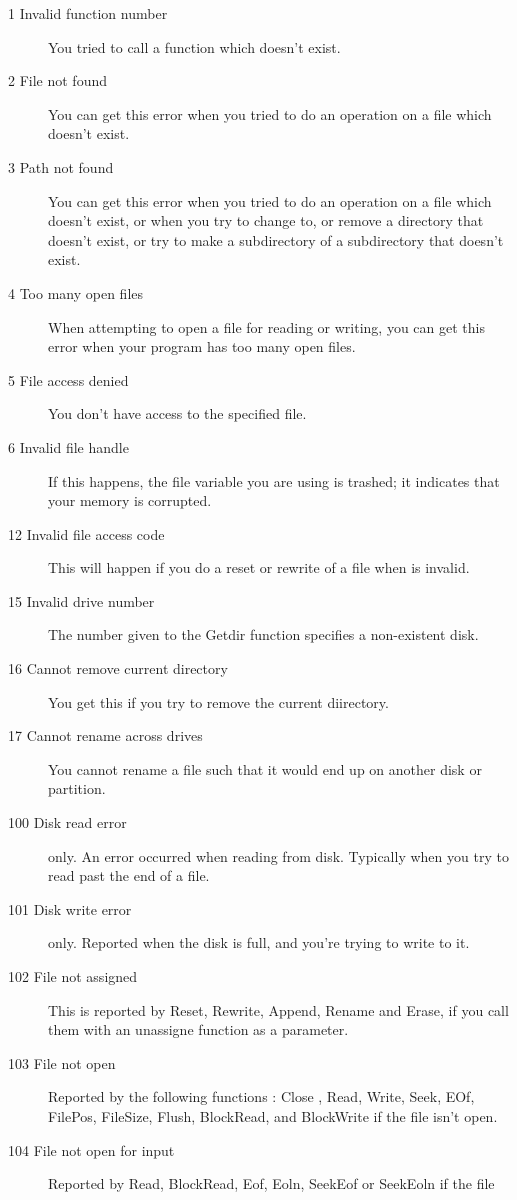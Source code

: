 \documentclass{report}
\begin{document}
\begin{description}
\item [1  Invalid function number]
You tried to call a \dos function which doesn't exist.
\item [2  File not found]
You can get this error when you tried to do an operation on a file which
doesn't exist.
\item [3  Path not found]
You can get this error when you tried to do an operation on a file which
doesn't exist, or when you try to change to, or remove a directory that doesn't exist,
or try to make a subdirectory  of a subdirectory that doesn't exist.
\item [4  Too many open files]
When attempting to open a file for reading or writing, you can get this
error when your program has too many open files.
\item [5  File access denied]
You don't have access to the specified file.
\item [6  Invalid file handle]
If this happens, the file variable you are using is trashed; it
indicates that your memory is corrupted.
\item [12  Invalid file access code]
This will happen if you do a reset or rewrite of a file when 
is invalid. 
\item [15  Invalid drive number]
The number given to the Getdir function specifies a non-existent disk.
\item [16  Cannot remove current directory]
You get this if you try to remove the current diirectory.
\item [17  Cannot rename across drives]
You cannot rename a file such that it would end up on another disk or
partition.
\item [100  Disk read error]
\dos only. An error occurred when reading from disk. Typically when you try
to read past the end of a file.
\item [101  Disk write error]
\dos only. Reported when the disk is full, and you're trying to write to it.
\item [102  File not assigned]
This is reported by Reset, Rewrite, Append, Rename and Erase, if you call
them with an unassigne function as a parameter.
\item [103  File not open]
Reported by the following functions : Close , Read, Write, Seek,
EOf, FilePos, FileSize, Flush, BlockRead, and BlockWrite if the file isn't
open.
\item [104  File not open for input]
Reported by Read, BlockRead, Eof, Eoln, SeekEof or SeekEoln if the file

\end{description}
\end{document}
